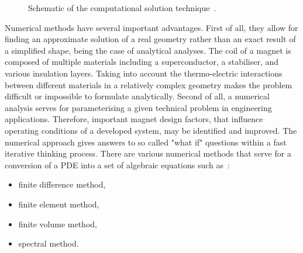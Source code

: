 \begin{figure}[H]
    \renewcommand{\baselinestretch}{0.7} 
    \centering
    \caption{Schematic of the computational solution technique~\cite{eth_introduction_to_finite_element}.}
    \label{fig:computational_solution_technique}
\end{figure}

Numerical methods have several important advantages. First of all, they allow for finding an approximate solution of a real geometry rather than an exact result of a simplified shape, being the case of analytical analyses. The coil of a magnet is composed of multiple materials including a superconductor, a stabiliser, and various insulation layers. Taking into account the thermo-electric interactions between different materials in a relatively complex geometry makes the problem difficult or impossible to formulate analytically. Second of all, a numerical analysis serves for parameterising a given technical problem in engineering applications. Therefore, important magnet design factors, that influence operating conditions of a developed system, may be identified and improved. The numerical approach gives answers to so called "what if" questions within a fast iterative thinking process. There are various numerical methods that serve for a conversion of a PDE into a set of algebraic equations such as~\cite{eth_introduction_to_finite_element, heat_transfer_practical_approach_cengel}: 
\begin{itemize}
    \item finite difference method,
    \item finite element method,
    \item finite volume method,
    \item spectral method.
\end{itemize}

